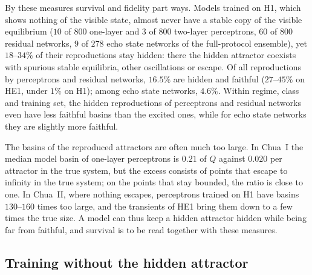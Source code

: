 By these measures survival and fidelity part ways. Models trained on H1, which shows nothing of the visible state, almost
never have a stable copy of the visible equilibrium ($10$ of $800$ one-layer and $3$ of $800$ two-layer perceptrons, $60$ of
$800$ residual networks, $9$ of $278$ echo state networks of the full-protocol ensemble), yet $18$--$34\%$ of their
reproductions stay hidden: there the hidden attractor coexists with spurious stable equilibria, other oscillations or
escape. Of all reproductions by perceptrons and residual networks, $16.5\%$ are hidden and faithful ($27$--$45\%$ on HE1,
under $1\%$ on H1); among echo state networks, $4.6\%$. Within regime, class and training set, the hidden reproductions of
perceptrons and residual networks even have less faithful basins than the excited ones, while for echo state networks they
are slightly more faithful.

The basins of the reproduced attractors are often much too large. In Chua~I the median model basin of one-layer
perceptrons is $0.21$ of $Q$ against $0.020$ per attractor in the true system, but the excess consists of points that escape
to infinity in the true system; on the points that stay bounded, the ratio is close to one. In Chua~II, where nothing
escapes, perceptrons trained on H1 have basins $130$--$160$ times too large, and the transients of HE1 bring them down to a
few times the true size. A model can thus keep a hidden attractor hidden while being far from faithful, and survival is to
be read together with these measures.

\subsection{Training without the hidden attractor}
\label{sec:e1}



